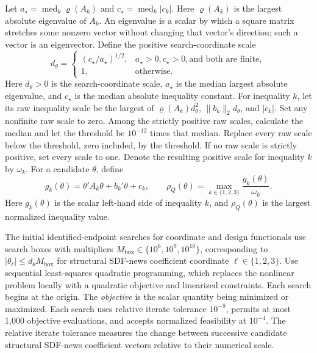 \documentclass[11pt]{article}
\begin{document}
Let \(a_\star=\operatorname{med}_k\varrho(A_k)\) and
\(c_\star=\operatorname{med}_k|c_k|\). Here \(\varrho(A_k)\) is the largest absolute eigenvalue
of \(A_k\). An eigenvalue is a scalar by which a square matrix stretches some nonzero vector
without changing that vector's direction; such a vector is an eigenvector. Define the positive search-coordinate scale
\begin{equation*}
 d_\theta=
 \begin{cases}
 (c_\star/a_\star)^{1/2},&a_\star>0, c_\star>0,
 \text{and both are finite},\\
 1,&\text{otherwise}.
 \end{cases}
\end{equation*}
Here \(d_\theta>0\) is the search-coordinate scale, \(a_\star\) is the median largest absolute
eigenvalue, and \(c_\star\) is the median absolute inequality constant. For inequality \(k\), let its raw inequality scale be the largest of
\(\varrho(A_k)d_\theta^2\), \(\|b_k\|_2d_\theta\), and \(|c_k|\). Set any nonfinite raw scale to zero.
Among the strictly positive raw scales, calculate the median and let the threshold be \(10^{-12}\)
times that median. Replace every raw scale below the threshold, zero included, by the threshold. If no
raw scale is strictly positive, set every scale to one. Denote
the resulting positive scale for inequality \(k\) by \(\omega_k\). For a candidate \(\theta\), define
\begin{equation*}
 g_k(\theta)=\theta'A_k\theta+b_k'\theta+c_k,
 \qquad
 \rho_Q(\theta)=\max_{k\in\{1,2,3\}}\frac{g_k(\theta)}{\omega_k}.
\end{equation*}
Here \(g_k(\theta)\) is the scalar left-hand side of inequality \(k\), and
\(\rho_Q(\theta)\) is the largest normalized inequality value.

The initial identified-endpoint searches for coordinate and design functionals use search boxes with multipliers
\(M_{\mathrm{box}}\in\{10^6,10^9,10^{10}\}\), corresponding to
\(|\theta_\ell|\le d_\theta M_{\mathrm{box}}\) for structural SDF-news coefficient coordinate
\(\ell\in\{1,2,3\}\). Use sequential least-squares quadratic programming, which replaces the
nonlinear problem locally with a quadratic objective and linearized constraints. Each search begins
at the origin. The \emph{objective} is the scalar quantity being minimized or maximized. Each search
uses relative iterate tolerance \(10^{-8}\), permits at most 1,000 objective evaluations, and accepts
normalized feasibility at \(10^{-4}\). The relative iterate tolerance measures the change between successive candidate
structural SDF-news coefficient vectors relative to their numerical scale.
\end{document}
